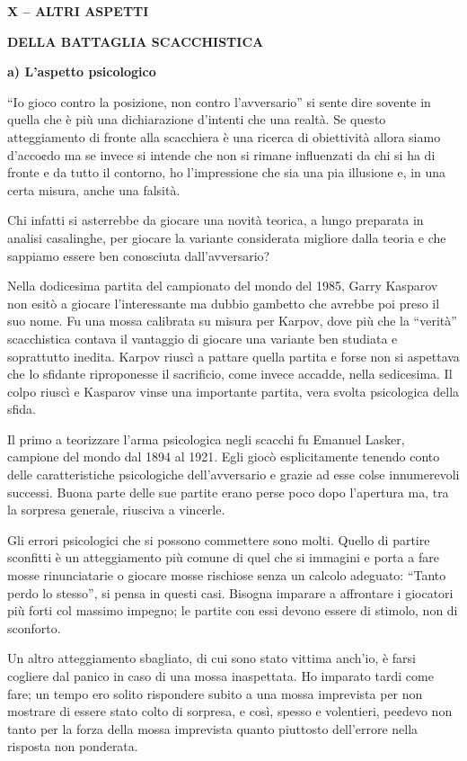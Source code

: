 \textbf{X -- ALTRI ASPETTI}

\textbf{DELLA BATTAGLIA SCACCHISTICA}

\textbf{a) L'aspetto psicologico}

``Io gioco contro la posizione, non contro l'avversario'' si sente dire
sovente in quella che è più una dichiarazione d'intenti che una realtà.
Se questo atteggiamento di fronte alla scacchiera è una ricerca di
obiettività allora siamo d'acco¢do ma se invece si intende che non si
rimane influenzati da chi si ha di fronte e da tutto il contorno, ho
l'impressione che sia una pia illusione e, in una certa misura, anche
una falsità.

Chi infatti si asterrebbe da giocare una novità teorica, a lungo
preparata in analisi casalinghe, per giocare la variante considerata
migliore dalla teoria e che sappiamo essere ben conosciuta
dall'avversario?

Nella dodicesima partita del campionato del mondo del 1985, Garry
Kasparov non esitò a giocare l'interessante ma dubbio gambetto che
avrebbe poi preso il suo nome. Fu una mossa calibrata su misura per
Karpov, dove più che la ``verità'' scacchistica contava il vantaggio di
giocare una variante ben studiata e soprattutto inedita. Karpov riuscì a
pattare quella partita e forse non si aspettava che lo sfidante
riproponesse il sacrificio, come invece accadde, nella sedicesima. Il
colpo riuscì e Kasparov vinse una importante partita, vera svolta
psicologica della sfida.

Il primo a teorizzare l'arma psicologica negli scacchi fu Emanuel
Lasker, campione del mondo dal 1894 al 1921. Egli giocò esplicitamente
tenendo conto delle caratteristiche psicologiche dell'avversario e
grazie ad esse colse innumerevoli successi. Buona parte delle sue
partite erano perse poco dopo l'apertura ma, tra la sorpresa generale,
riusciva a vincerle.

Gli errori psicologici che si possono commettere sono molti. Quello di
partire sconfitti è un atteggiamento più comune di quel che si immagini
e porta a fare mosse rinunciatarie o giocare mosse rischiose senza un
calcolo adeguato: ``Tanto perdo lo stesso'', si pensa in questi casi.
Bisogna imparare a affrontare i giocatori più forti col massimo impegno;
le partite con essi devono essere di stimolo, non di sconforto.

Un altro atteggiamento sbagliato, di cui sono stato vittima anch'io, è
farsi cogliere dal panico in caso di una mossa inaspettata. Ho imparato
tardi come fare; un tempo ero solito rispondere subito a una mossa
imprevista per non mostrare di essere stato colto di sorpresa, e così,
spesso e volentieri, pe¢devo non tanto per la forza della mossa
imprevista quanto piuttosto dell'errore nella risposta non ponderata.

